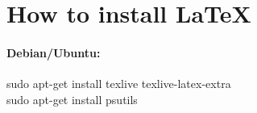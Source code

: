 \chapter{How to install \LaTeX} 

\subsubsection*{Debian/Ubuntu:}
sudo apt-get install texlive texlive-latex-extra \\
sudo apt-get install psutils
